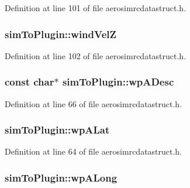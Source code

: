 Definition at line 101 of file aerosimrcdatastruct.\-h.

\hypertarget{group___aero_sim_r_c_ga28ceecb62e11bce71b44c63ea4af67aa}{
\subsubsection[{wind\-Vel\-Z}]{ sim\-To\-Plugin\-::wind\-Vel\-Z}}\label{group___aero_sim_r_c_ga28ceecb62e11bce71b44c63ea4af67aa}


Definition at line 102 of file aerosimrcdatastruct.\-h.

\hypertarget{group___aero_sim_r_c_ga527aaa5fbbb0b3108b4ccace20e252d2}{
\subsubsection[{wp\-A\-Desc}]{\setlength{\rightskip}{0pt plus 5cm}const char$\ast$ sim\-To\-Plugin\-::wp\-A\-Desc}}\label{group___aero_sim_r_c_ga527aaa5fbbb0b3108b4ccace20e252d2}


Definition at line 66 of file aerosimrcdatastruct.\-h.

\hypertarget{group___aero_sim_r_c_ga1eb50174e2e2f438f0b1aef4dca0744f}{
\subsubsection[{wp\-A\-Lat}]{ sim\-To\-Plugin\-::wp\-A\-Lat}}\label{group___aero_sim_r_c_ga1eb50174e2e2f438f0b1aef4dca0744f}


Definition at line 64 of file aerosimrcdatastruct.\-h.

\hypertarget{group___aero_sim_r_c_gacda15282e441109ecba7a4709e9b8a0c}{
\subsubsection[{wp\-A\-Long}]{ sim\-To\-Plugin\-::wp\-A\-Long}}\label{group___aero_sim_r_c_gacda15282e441109ecba7a4709e9b8a0c}



